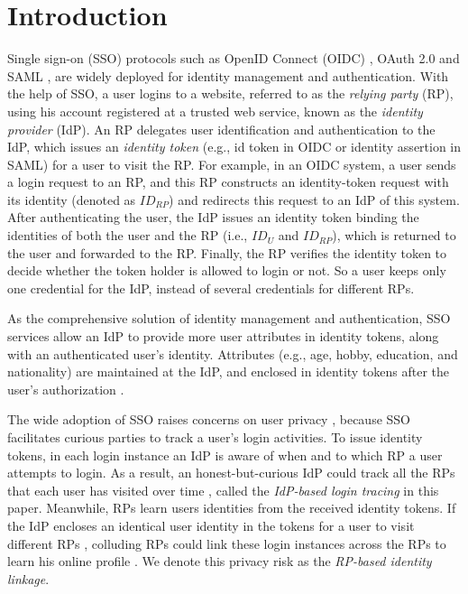 \section{Introduction}
\label{sec:intro}
Single sign-on (SSO) protocols such as OpenID Connect (OIDC) \cite{OpenIDConnect}, OAuth 2.0 \cite{rfc6749} and SAML \cite{SAML,SAMLIdentifier},
 are widely deployed for identity management and authentication.
 With the help of SSO,
  a user logins to a website, referred to as the \emph{relying party} (RP), using his account registered at a trusted web service,
   known as the \emph{identity provider} (IdP).
An RP delegates user identification and authentication to the IdP,
    which issues an \emph{identity token} (e.g., id token in OIDC or identity assertion in SAML) for a user to visit the RP. %
For example, in an OIDC system,
     a user sends a login request to an RP,
and this RP constructs an identity-token request with its identity (denoted as $ID_{RP}$) and redirects this request to an IdP of this system.
After authenticating the user,
 the IdP issues an identity token binding the identities of both the user and the RP (i.e., $ID_U$ and $ID_{RP}$),
    which is returned to the user and forwarded to the RP.
Finally, the RP verifies the identity token to decide whether the token holder is allowed to login or not.
So a user keeps only one credential for the IdP, instead of several credentials for different RPs.

As the comprehensive solution of identity management and authentication,
    SSO services allow an IdP to provide more user attributes in identity tokens,
        along with an authenticated user's identity.
Attributes (e.g., age, hobby, education, and nationality) are maintained at the IdP,
    and enclosed in identity tokens after the user's authorization \cite{OpenIDConnect,rfc6749}.

The wide adoption of SSO raises concerns on user privacy \cite{NIST2017draft,SPRESSO,BrowserID,maler2008venn},
 because SSO facilitates curious parties to track a user's login activities.
To issue identity tokens,
in each login instance
 an IdP is aware of when and to which RP a user attempts to login.
As a result, an honest-but-curious IdP could track all the RPs that each user has visited over time \cite{BrowserID,SPRESSO},
 called the {\em IdP-based login tracing} in this paper.
Meanwhile, RPs learn users identities from the received identity tokens.
If the IdP encloses an identical user identity in the tokens for a user to visit different RPs \cite{maler2008venn,Google,FirefoxAccount},
     colluding RPs could link these login instances across the RPs %
      to learn his online profile \cite{maler2008venn}.
We denote this privacy risk as the {\em RP-based identity linkage}.



